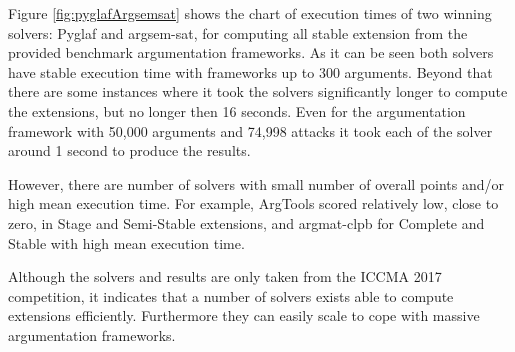 Figure \ref{fig:pyglafArgsemsat} shows the chart of execution times of two winning solvers: Pyglaf and argsem-sat, for computing all stable extension from the provided benchmark argumentation frameworks. As it can be seen both solvers have stable execution time with frameworks up to 300 arguments. Beyond that there are some instances where it took the solvers significantly longer to compute the extensions, but no longer then 16 seconds. Even for the argumentation framework with 50,000 arguments and 74,998 attacks it took each of the solver around 1 second to produce the results.

However, there are number of solvers with small number of overall points and/or high mean execution time. For example, ArgTools \citep{argtools} scored relatively low, close to zero, in Stage and Semi-Stable extensions, and argmat-clpb for Complete and Stable with high mean execution time. 

Although the solvers and results are only taken from the ICCMA 2017 competition, it indicates that a number of solvers exists able to compute extensions efficiently. Furthermore they can easily scale to cope with massive argumentation frameworks. 